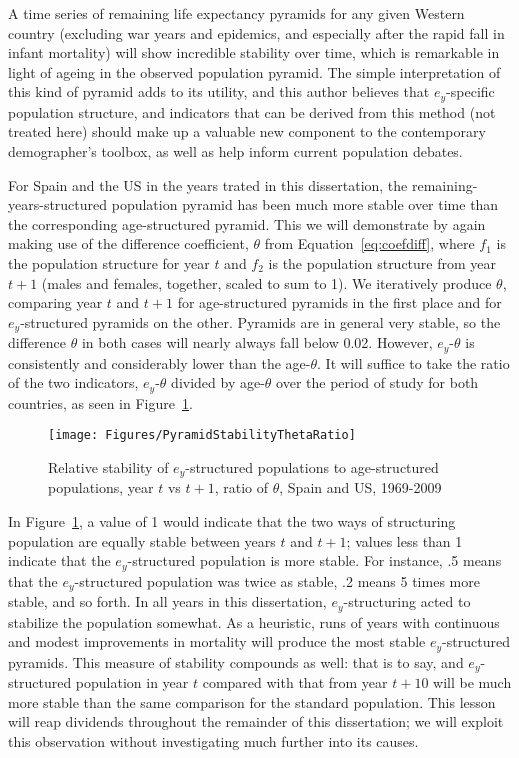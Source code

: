 A time series of remaining life expectancy pyramids for any given Western 
country (excluding war years and epidemics, and especially after the rapid fall
in infant mortality) will show incredible stability over time, which is
remarkable in light of ageing in the observed population pyramid. The simple 
interpretation of this kind of pyramid adds to its utility, and this author 
believes that $e_y$-specific population structure, and
indicators that can be derived from this method (not treated here) should 
make up a valuable new component to the contemporary demographer's toolbox, as well 
as help inform current population debates. 

For Spain and the US in the years trated in this dissertation,
the remaining-years-structured population pyramid has been much more
stable over time than the corresponding age-structured pyramid. This we will
demonstrate by again making use of the difference coefficient, $\theta$ from Equation~\ref{eq:coefdiff}, where $f_1$ is the
population structure for year $t$ and $f_2$ is the population structure from
year $t+1$ (males and females, together, scaled to sum to 1). We iteratively
produce $\theta$, comparing year $t$ and $t+1$ for age-structured pyramids in
the first place and for $e_y$-structured pyramids on the other. Pyramids are in
general very stable, so the difference $\theta$ in both cases will nearly always
fall below 0.02. However, $e_y$-$\theta$ is consistently and considerably lower
than the age-$\theta$. It will suffice to take the ratio of the two indicators,
 $e_y$-$\theta$ divided by age-$\theta$ over the period of study for both
 countries, as seen in Figure~\ref{fig:PyramidStability}.

\begin{figure}
      \centering
      \caption{Relative stability of $e_y$-structured populations to
                age-structured populations, year $t$ vs $t+1$, ratio of
                $\theta$, Spain and US, 1969-2009} 
         \texttt{[image: Figures/PyramidStabilityThetaRatio]}
      \label{fig:PyramidStability} 
\end{figure}

In Figure~\ref{fig:PyramidStability}, a value of 1 would indicate that the two
ways of structuring population are equally stable between years $t$ and $t+1$;
values less than 1 indicate that the $e_y$-structured population is more stable.
For instance, .5 means that the $e_y$-structured population was twice as stable,
.2 means 5 times more stable, and so forth. In all years in this dissertation,
$e_y$-structuring acted to stabilize the population somewhat. As a heuristic,
runs of years with continuous and modest improvements in mortality will produce
the most stable $e_y$-structured pyramids. This measure of stability compounds
as well: that is to say, and $e_y$-structured population in year $t$
compared with that from year $t+10$ will be much more stable than the same
comparison for the standard population. This lesson will reap dividends
throughout the remainder of this dissertation; we will exploit this observation
without investigating much further into its causes.

